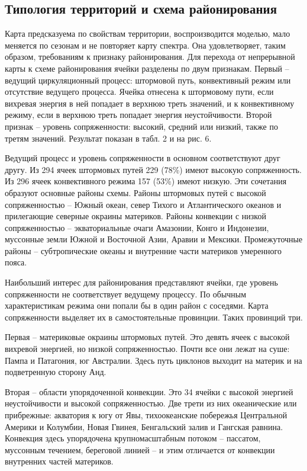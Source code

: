 \documentclass[12pt,a4paper]{article}
\begin{document}
\subsection{Типология территорий и схема районирования}

Карта предсказуема по свойствам территории, воспроизводится моделью, мало меняется по сезонам и не повторяет карту спектра. Она удовлетворяет, таким образом, требованиям к признаку районирования. Для перехода от непрерывной карты к схеме районирования ячейки разделены по двум признакам. Первый -- ведущий циркуляционный процесс: штормовой путь, конвективный режим или отсутствие ведущего процесса. Ячейка отнесена к штормовому пути, если вихревая энергия в ней попадает в верхнюю треть значений, и к конвективному режиму, если в верхнюю треть попадает энергия неустойчивости. Второй признак -- уровень сопряженности: высокий, средний или низкий, также по третям значений. Результат показан в табл. 2 и на рис. 6.

Ведущий процесс и уровень сопряженности в основном соответствуют друг другу. Из 294 ячеек штормовых путей 229 (78\%) имеют высокую сопряженность. Из 296 ячеек конвективного режима 157 (53\%) имеют низкую. Эти сочетания образуют основные районы схемы. Районы штормовых путей с высокой сопряженностью -- Южный океан, север Тихого и Атлантического океанов и прилегающие северные окраины материков. Районы конвекции с низкой сопряженностью -- экваториальные очаги Амазонии, Конго и Индонезии, муссонные земли Южной и Восточной Азии, Аравии и Мексики. Промежуточные районы -- субтропические океаны и внутренние части материков умеренного пояса.

Наибольший интерес для районирования представляют ячейки, где уровень сопряженности не соответствует ведущему процессу. По обычным характеристикам режима они попали бы в один район с соседями. Карта сопряженности выделяет их в самостоятельные провинции. Таких провинций три.

Первая -- материковые окраины штормовых путей. Это девять ячеек с высокой вихревой энергией, но низкой сопряженностью. Почти все они лежат на суше: Пампа и Патагония, юг Австралии. Здесь путь циклонов выходит на материк и на подветренную сторону Анд.

Вторая -- области упорядоченной конвекции. Это 34 ячейки с высокой энергией неустойчивости и высокой сопряженностью. Две трети из них океанические или прибрежные: акватория к югу от Явы, тихоокеанские побережья Центральной Америки и Колумбии, Новая Гвинея, Бенгальский залив и Гангская равнина. Конвекция здесь упорядочена крупномасштабным потоком -- пассатом, муссонным течением, береговой линией -- и этим отличается от конвекции внутренних частей материков.
\end{document}
